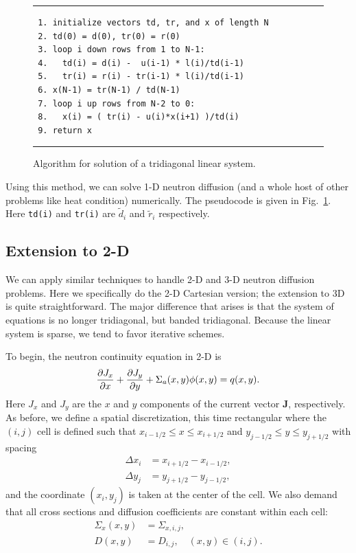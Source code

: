 \begin{figure}[tb!]
\begin{center}
\noindent \rule{\textwidth}{1pt}
\begin{verbatim}
 1. initialize vectors td, tr, and x of length N
 2. td(0) = d(0), tr(0) = r(0)
 3. loop i down rows from 1 to N-1:
 4.   td(i) = d(i) -  u(i-1) * l(i)/td(i-1)
 5.   tr(i) = r(i) - tr(i-1) * l(i)/td(i-1)
 6. x(N-1) = tr(N-1) / td(N-1)
 7. loop i up rows from N-2 to 0:
 8.   x(i) = ( tr(i) - u(i)*x(i+1) )/td(i)
 9. return x
\end{verbatim}
\rule{\textwidth}{1pt}
\caption{Algorithm for solution of a tridiagonal linear system.}
\label{Fig:linearAlgebra_tridiagonalSolveAlgorithm}
\end{center}
\end{figure}

 Using this method, we can solve 1-D neutron diffusion (and a whole host of other problems like heat condition) numerically. The pseudocode is given in Fig.~\ref{Fig:linearAlgebra_tridiagonalSolveAlgorithm}. Here \texttt{td(i)} and \texttt{tr(i)} are $\widetilde{d}_i$ and $\widetilde{r}_i$ respectively. 
 
 
 

\subsection{Extension to 2-D}

We can apply similar techniques to handle 2-D and 3-D neutron diffusion problems. Here we specifically do the 2-D Cartesian version; the extension to 3D is quite straightforward. The major difference that arises is that the system of equations is no longer tridiagonal, but banded tridiagonal. Because the linear system is sparse, we tend to favor iterative schemes.

To begin, the neutron continuity equation in 2-D is
\begin{align}
  \frac{ \partial {J_x} }{ \partial {x} } + \frac{ \partial {J_y} }{ \partial {y} } + \Sigma_a(x,y) \phi(x,y) = q(x,y) .
\end{align}
Here $J_x$ and $J_y$ are the $x$ and $y$ components of the current vector $\mathbf{J}$, respectively. As before, we define a spatial discretization, this time rectangular where the $(i,j)$ cell is defined such that $x_{i-1/2} \le x \le x_{i+1/2}$ and $y_{j-1/2} \le y \le y_{j+1/2}$ with spacing
\begin{subequations}
\begin{align}
  \Delta x_i &= x_{i+1/2} - x_{i-1/2}, \\
  \Delta y_j &= y_{j+1/2} - y_{j-1/2},
\end{align}
\end{subequations}
and the coordinate $(x_i,y_j)$ is taken at the center of the cell. We also demand that all cross sections and diffusion coefficients are constant within each cell:
\begin{subequations}
\begin{align}
  \Sigma_x(x,y) &= \Sigma_{x,i,j} ,  \\
  D(x,y) &= D_{i,j},  \quad (x,y) \in (i,j).
\end{align}
\end{subequations}

